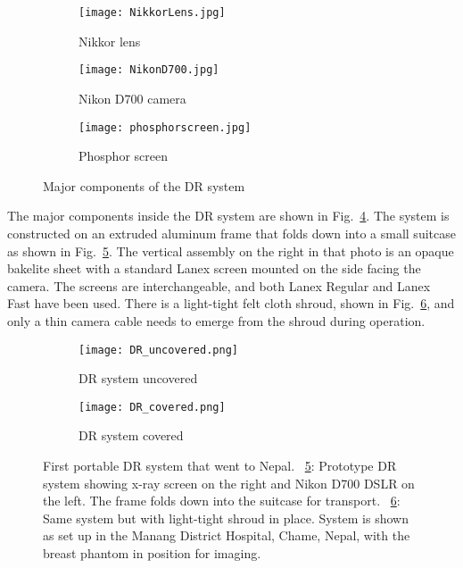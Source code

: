 \begin{figure}[h]
	\begin{subfigure}[b]{0.3\linewidth}
		\centering
		\texttt{[image: NikkorLens.jpg]}
		\caption{Nikkor lens}
		\label{fig:nikonlens}
	\end{subfigure}
	\hspace{0.2cm}
	\begin{subfigure}[b]{0.3\linewidth}
		\centering
		\texttt{[image: NikonD700.jpg]}
		\caption{Nikon D700 camera}
		\label{fig:nikoncamera}
	\end{subfigure}
	\hspace{0.2cm}
	\begin{subfigure}[b]{0.3\linewidth}
		\texttt{[image: phosphorscreen.jpg]}
		\caption{Phosphor screen}
		\label{fig:phosphorscreen}
	\end{subfigure}
\caption{Major components of the DR system}
\label{fig:DRcomponents}
\end{figure}

The major components inside the DR system are shown in Fig.~\ref{fig:DRcomponents}.  The system is constructed on an extruded aluminum frame that folds down into a small suitcase as shown in Fig.~\ref{fig:DR1uncovered}. The vertical assembly on the right in that photo is an opaque bakelite sheet with a standard Lanex screen mounted on the side facing the camera. The screens are interchangeable, and both Lanex Regular and Lanex Fast have been used. There is a light-tight felt cloth shroud, shown in Fig.~\ref{fig:DR1covered}, and only a thin camera cable needs to emerge from the shroud during operation.

\begin{figure}[h]
\centering
	\begin{subfigure}[b]{0.45\linewidth}
	\texttt{[image: DR\_uncovered.png]}
	\caption{DR system uncovered}
	\label{fig:DR1uncovered}
	\end{subfigure}
\hspace{0.2cm}
	\begin{subfigure}[b]{0.45\linewidth}
	\centering
	\texttt{[image: DR\_covered.png]}
	\caption{DR system covered}
	\label{fig:DR1covered}
	\end{subfigure}
\caption{First portable DR system that went to Nepal.  ~\ref{fig:DR1uncovered}: Prototype DR system showing x-ray screen on the right and Nikon D700 DSLR on the left.  The frame folds down into the suitcase for transport.  ~\ref{fig:DR1covered}: Same system but with light-tight shroud in place.  System is shown as set up in the Manang District Hospital, Chame, Nepal, with the breast phantom in position for imaging.}
\label{fig:DR1}
\end{figure}

